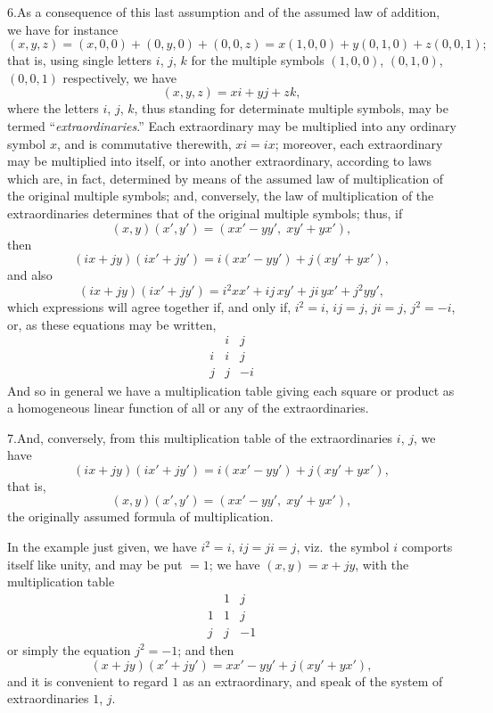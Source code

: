 \documentclass[11pt]{article}
\begin{document}
6.\quad As a consequence of this last assumption and of the assumed law of addition, we have for instance
\[
(x, y, z) = (x, 0, 0) + (0, y, 0) + (0, 0, z)
       = x(1, 0, 0) + y(0, 1, 0) + z(0, 0, 1);
\]
that is, using single letters $i$, $j$, $k$ for the multiple symbols $(1, 0, 0)$, $(0, 1, 0)$, $(0, 0, 1)$ respectively, we have
\[
(x, y, z) = xi + yj + zk,
\]
where the letters $i$, $j$, $k$, thus standing for determinate multiple symbols, may be termed ``\textit{extraordinaries}.'' Each extraordinary may be multiplied into any ordinary symbol $x$, and is commutative therewith, $xi = ix$; moreover, each extraordinary may be multiplied into itself, or into another extraordinary, according to laws which are, in fact, determined by means of the assumed law of multiplication of the original multiple symbols; and, conversely, the law of multiplication of the extraordinaries determines that of the original multiple symbols; thus, if
\[
(x, y)(x', y') = (xx' - yy',\; xy' + yx'),
\]
then
\[
(ix + jy)(ix' + jy') = i(xx' - yy') + j(xy' + yx'),
\]
and also
\[
(ix + jy)(ix' + jy') = i^{2}xx' + ij\,xy' + ji\,yx' + j^{2}yy',
\]
which expressions will agree together if, and only if, $i^{2} = i$, $ij = j$, $ji = j$, $j^{2} = -i$, or, as these equations may be written,
\[
\begin{array}{c|cc}
 & i & j \\ \hline
i & i & j \\
j & j & -i
\end{array}
\]
And so in general we have a multiplication table giving each square or product as a homogeneous linear function of all or any of the extraordinaries.

7.\quad And, conversely, from this multiplication table of the extraordinaries $i$, $j$, we have
\[
(ix + jy)(ix' + jy') = i(xx' - yy') + j(xy' + yx'),
\]
that is,
\[
(x, y)(x', y') = (xx' - yy',\; xy' + yx'),
\]
the originally assumed formula of multiplication.

In the example just given, we have $i^{2} = i$, $ij = ji = j$, viz.\ the symbol $i$ comports itself like unity, and may be put $= 1$; we have $(x, y) = x + jy$, with the multiplication table
\[
\begin{array}{c|cc}
 & 1 & j \\ \hline
1 & 1 & j \\
j & j & -1
\end{array}
\]
or simply the equation $j^{2} = -1$; and then
\[
(x + jy)(x' + jy') = xx' - yy' + j(xy' + yx'),
\]
and it is convenient to regard $1$ as an extraordinary, and speak of the system of extraordinaries $1$, $j$.
\end{document}
